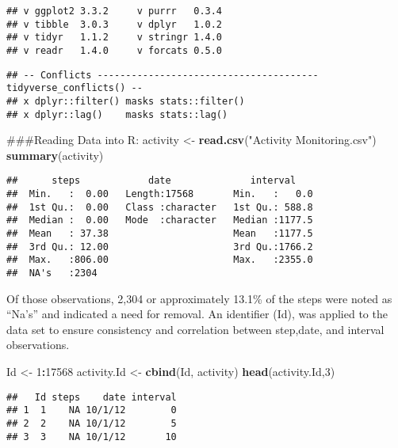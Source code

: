 \documentclass[]{article}
\newenvironment{Shaded}{\begin{snugshade}}{\end{snugshade}}
\newcommand{\KeywordTok}[1]{\textcolor[rgb]{0.13,0.29,0.53}{\textbf{#1}}}
\newcommand{\DecValTok}[1]{\textcolor[rgb]{0.00,0.00,0.81}{#1}}
\newcommand{\StringTok}[1]{\textcolor[rgb]{0.31,0.60,0.02}{#1}}
\newcommand{\OperatorTok}[1]{\textcolor[rgb]{0.81,0.36,0.00}{\textbf{#1}}}
\newcommand{\NormalTok}[1]{#1}
\begin{document}
\begin{verbatim}
## v ggplot2 3.3.2     v purrr   0.3.4
## v tibble  3.0.3     v dplyr   1.0.2
## v tidyr   1.1.2     v stringr 1.4.0
## v readr   1.4.0     v forcats 0.5.0
\end{verbatim}

\begin{verbatim}
## -- Conflicts --------------------------------------- tidyverse_conflicts() --
## x dplyr::filter() masks stats::filter()
## x dplyr::lag()    masks stats::lag()
\end{verbatim}

\begin{Shaded}
\begin{Highlighting}[]
\NormalTok{###Reading Data into R:}
\NormalTok{activity <-}\StringTok{ }\KeywordTok{read.csv}\NormalTok{(}\StringTok{"Activity Monitoring.csv"}\NormalTok{)}
\KeywordTok{summary}\NormalTok{(activity)}
\end{Highlighting}
\end{Shaded}

\begin{verbatim}
##      steps            date              interval     
##  Min.   :  0.00   Length:17568       Min.   :   0.0  
##  1st Qu.:  0.00   Class :character   1st Qu.: 588.8  
##  Median :  0.00   Mode  :character   Median :1177.5  
##  Mean   : 37.38                      Mean   :1177.5  
##  3rd Qu.: 12.00                      3rd Qu.:1766.2  
##  Max.   :806.00                      Max.   :2355.0  
##  NA's   :2304
\end{verbatim}

Of those observations, 2,304 or approximately 13.1\% of the steps were
noted as ``Na's'' and indicated a need for removal. An identifier (Id),
was applied to the data set to ensure consistency and correlation
between step,date, and interval observations.

\begin{Shaded}
\begin{Highlighting}[]
\NormalTok{Id <-}\StringTok{ }\DecValTok{1}\OperatorTok{:}\DecValTok{17568}
\NormalTok{activity.Id <-}\StringTok{ }\KeywordTok{cbind}\NormalTok{(Id, activity)}
\KeywordTok{head}\NormalTok{(activity.Id,}\DecValTok{3}\NormalTok{)}
\end{Highlighting}
\end{Shaded}

\begin{verbatim}
##   Id steps    date interval
## 1  1    NA 10/1/12        0
## 2  2    NA 10/1/12        5
## 3  3    NA 10/1/12       10
\end{verbatim}
\end{document}
